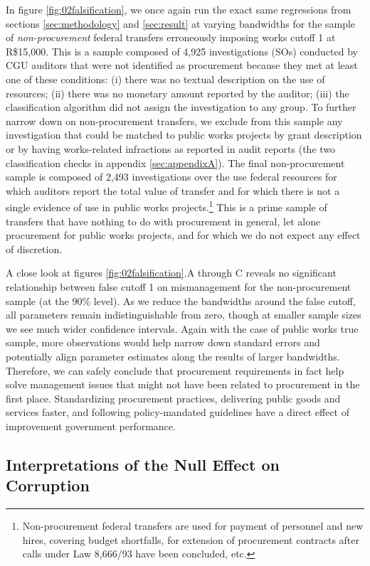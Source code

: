 \documentclass[11pt]{article}
\begin{document}
In figure \ref{fig:02falsification}, we once again run the exact same regressions from sections \ref{sec:methodology} and \ref{sec:result} at varying bandwidths for the sample of \emph{non-procurement} federal transfers erroneously imposing works cutoff 1 at R\$15,000. This is a sample composed of 4,925 investigations (SOs) conducted by CGU auditors that were not identified as procurement because they met at least one of these conditions: (i) there was no textual description on the use of resources; (ii) there was no monetary amount reported by the auditor; (iii) the classification algorithm did not assign the investigation to any group. To further narrow down on non-procurement transfers, we exclude from this sample any investigation that could be matched to public works projects by grant description or by having works-related infractions as reported in audit reports (the two classification checks in appendix \ref{sec:appendixA}). The final non-procurement sample is composed of 2,493 investigations over the use federal resources for which auditors report the total value of transfer and for which there is not a single evidence of use in public works projects.\footnote{Non-procurement federal transfers are used for payment of personnel and new hires, covering budget shortfalls, for extension of procurement contracts after calls under Law 8,666/93 have been concluded, etc.} This is a prime sample of transfers that have nothing to do with procurement in general, let alone procurement for public works projects, and for which we do not expect any effect of discretion.

A close look at figures \ref{fig:02falsification}.A through C reveals  no significant relationship between false cutoff 1 on mismanagement for the non-procurement sample (at the 90\% level). As we reduce the bandwidths around the false cutoff, all parameters remain indistinguishable from zero, though at smaller sample sizes we see much wider confidence intervals. Again with the case of public works true sample, more observations would help narrow down standard errors and potentially align parameter estimates along the results of larger bandwidths. Therefore, we can safely conclude that procurement requirements in fact help solve management issues that might not have been related to procurement in the first place. Standardizing procurement practices, delivering public goods and services faster, and following policy-mandated guidelines have a direct effect of improvement government performance.
\clearpage

\subsection{Interpretations of the Null Effect on Corruption} \label{subsec:nullcorruption}
\end{document}

